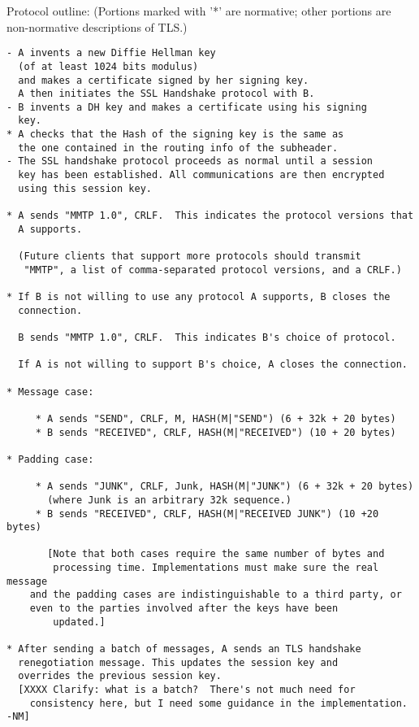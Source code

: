 Protocol outline: (Portions marked with '*' are normative; other
portions are non-normative descriptions of TLS.)

\begin{verbatim}
- A invents a new Diffie Hellman key 
  (of at least 1024 bits modulus)
  and makes a certificate signed by her signing key.
  A then initiates the SSL Handshake protocol with B.
- B invents a DH key and makes a certificate using his signing
  key.
* A checks that the Hash of the signing key is the same as
  the one contained in the routing info of the subheader.
- The SSL handshake protocol proceeds as normal until a session
  key has been established. All communications are then encrypted
  using this session key.

* A sends "MMTP 1.0", CRLF.  This indicates the protocol versions that
  A supports.

  (Future clients that support more protocols should transmit
   "MMTP", a list of comma-separated protocol versions, and a CRLF.)

* If B is not willing to use any protocol A supports, B closes the 
  connection.

  B sends "MMTP 1.0", CRLF.  This indicates B's choice of protocol.

  If A is not willing to support B's choice, A closes the connection.

* Message case:

     * A sends "SEND", CRLF, M, HASH(M|"SEND") (6 + 32k + 20 bytes)
     * B sends "RECEIVED", CRLF, HASH(M|"RECEIVED") (10 + 20 bytes)

* Padding case:

     * A sends "JUNK", CRLF, Junk, HASH(M|"JUNK") (6 + 32k + 20 bytes)
       (where Junk is an arbitrary 32k sequence.)
     * B sends "RECEIVED", CRLF, HASH(M|"RECEIVED JUNK") (10 +20 bytes)

       [Note that both cases require the same number of bytes and 
        processing time. Implementations must make sure the real message 
	and the padding cases are indistinguishable to a third party, or 
	even to the parties involved after the keys have been
        updated.]

* After sending a batch of messages, A sends an TLS handshake
  renegotiation message. This updates the session key and
  overrides the previous session key.
  [XXXX Clarify: what is a batch?  There's not much need for
    consistency here, but I need some guidance in the implementation. -NM]

\end{verbatim}

